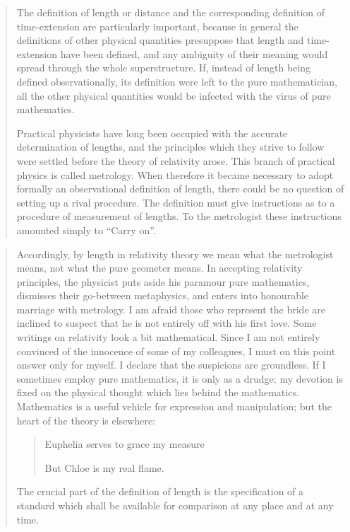 \begin{quote}
    The definition of length or distance and the corresponding definition of time-extension are particularly important, because in general the definitions of other physical quantities presuppose that length and time-extension have been defined, and any ambiguity of their meaning would spread through the whole superstructure.  If, instead of length being defined observationally, its definition were left to the pure mathematician, all the other physical quantities would be infected with the virus of pure mathematics.  
    
    Practical physicists have long been occupied with the accurate determination of lengths, and the principles which they strive to follow were settled before the theory of relativity arose.  This branch of practical physics is called metrology.  When therefore it became necessary to adopt formally an observational definition of length, there could be no question of setting up a rival procedure.  The definition must give instructions as to a procedure of measurement of lengths.  To the metrologist these instructions amounted simply to ``Carry on''.
    
    \citep[p. 73]{Eddington1939}
\end{quote}

\begin{quote}
    Accordingly, by length in relativity theory we mean what the metrologist means, not what the pure geometer means.  In accepting relativity principles, the physicist puts aside his paramour pure mathematics, dismisses their go-between metaphysics, and enters into honourable marriage with metrology.  I am afraid those who represent the bride are inclined to suspect that he is not entirely off with his first love.  Some writings on relativity look a bit mathematical.  Since I am not entirely convinced of the innocence of some of my colleagues, I must on this point answer only for myself.  I declare that the suspicions are groundless.  If I sometimes employ pure mathematics, it is only as a drudge; my devotion is fixed on the physical thought which lies behind the mathematics.  Mathematics is a useful vehicle for expression and manipulation; but the heart of the theory is elsewhere:
    
    \begin{quote}
        \begin{center}
            Euphelia serves to grace my measure
            
            But Chloe is my real flame.
        \end{center}
    \end{quote}
    
    The crucial part of the definition of length is the specification of a standard which shall be available for comparison at any place and at any time.  
    
    \citep[p. 74]{Eddington1939}
\end{quote}

